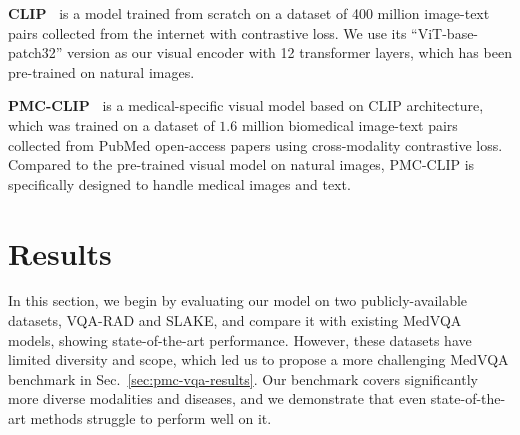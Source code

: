 \documentclass{article}
\begin{document}
\noindent \textbf{CLIP~\cite{radford2021learning}} is a model trained from scratch on a dataset of 400 million image-text pairs collected from the internet with contrastive loss. We use its ``ViT-base-patch32'' version as our visual encoder with 12 transformer layers, which has been pre-trained on natural images.

\noindent \textbf{PMC-CLIP~\cite{lin2023pmcclip}} is a medical-specific visual model based on CLIP architecture, which was trained on a dataset of $1.6$ million biomedical image-text pairs collected from PubMed open-access papers using cross-modality contrastive loss. Compared to the pre-trained visual model on natural images, PMC-CLIP is specifically designed to handle medical images and text.
















 
\section{Results}

In this section, we begin by evaluating our model on two publicly-available datasets, VQA-RAD and SLAKE, and compare it with existing MedVQA models, showing state-of-the-art performance. However, these datasets have limited diversity and scope, which led us to propose a more challenging MedVQA benchmark in Sec.~\ref{sec:pmc-vqa-results}. Our benchmark covers significantly more diverse modalities and diseases, and we demonstrate that even state-of-the-art methods struggle to perform well on it.
\end{document}
